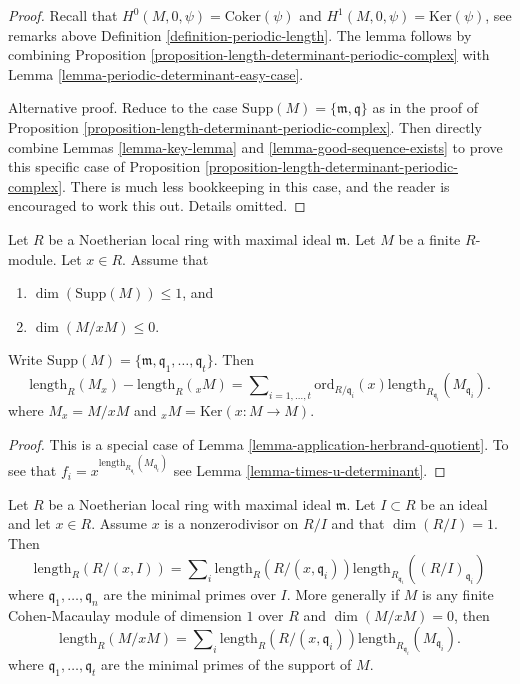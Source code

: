 \begin{proof}
Recall that $H^0(M, 0, \psi) = \text{Coker}(\psi)$ and
$H^1(M, 0, \psi) = \text{Ker}(\psi)$, see remarks above
Definition \ref{definition-periodic-length}.
The lemma follows by combining
Proposition \ref{proposition-length-determinant-periodic-complex} with
Lemma \ref{lemma-periodic-determinant-easy-case}.

\medskip\noindent
Alternative proof. Reduce to the case
$\text{Supp}(M) = \{\mathfrak m, \mathfrak q\}$
as in the proof of
Proposition \ref{proposition-length-determinant-periodic-complex}.
Then directly combine
Lemmas \ref{lemma-key-lemma} and
\ref{lemma-good-sequence-exists}
to prove this specific case of
Proposition \ref{proposition-length-determinant-periodic-complex}.
There is much less bookkeeping in this case, and the reader is
encouraged to work this out. Details omitted.
\end{proof}

\begin{lemma}
\label{lemma-length-multiplication}
Let $R$ be a Noetherian local ring with maximal ideal $\mathfrak m$.
Let $M$ be a finite $R$-module.
Let $x \in R$.
Assume that
\begin{enumerate}
\item $\dim(\text{Supp}(M)) \leq 1$, and
\item $\dim(M/xM) \leq 0$.
\end{enumerate}
Write
$\text{Supp}(M) = \{\mathfrak m, \mathfrak q_1, \ldots, \mathfrak q_t\}$.
Then
$$
\text{length}_R(M_x)
-
\text{length}_R({}_xM)
=
\sum\nolimits_{i = 1, \ldots, t}
\text{ord}_{R/\mathfrak q_i}(x)
\text{length}_{R_{\mathfrak q_i}}(M_{\mathfrak q_i}).
$$
where $M_x = M/xM$ and ${}_xM = \text{Ker}(x : M \to M)$.
\end{lemma}

\begin{proof}
This is a special case of Lemma \ref{lemma-application-herbrand-quotient}.
To see that $f_i = x^{\text{length}_{R_{\mathfrak q_i}}(M_{\mathfrak q_i})}$
see Lemma \ref{lemma-times-u-determinant}.
\end{proof}

\begin{lemma}
\label{lemma-additivity-divisors-restricted}
Let $R$ be a Noetherian local ring with maximal ideal $\mathfrak m$.
Let $I \subset R$ be an ideal and let $x \in R$.
Assume $x$ is a nonzerodivisor on $R/I$ and that $\dim(R/I) = 1$.
Then
$$
\text{length}_R(R/(x, I))
=
\sum\nolimits_i \text{length}_R(R/(x, \mathfrak q_i))
\text{length}_{R_{\mathfrak q_i}}((R/I)_{\mathfrak q_i})
$$
where $\mathfrak q_1, \ldots, \mathfrak q_n$ are the minimal
primes over $I$. More generally if $M$ is any finite Cohen-Macaulay
module of dimension $1$ over $R$ and $\dim(M/xM) = 0$, then
$$
\text{length}_R(M/xM)
=
\sum\nolimits_i \text{length}_R(R/(x, \mathfrak q_i))
\text{length}_{R_{\mathfrak q_i}}(M_{\mathfrak q_i}).
$$
where $\mathfrak q_1, \ldots, \mathfrak q_t$ are the
minimal primes of the support of $M$.
\end{lemma}

